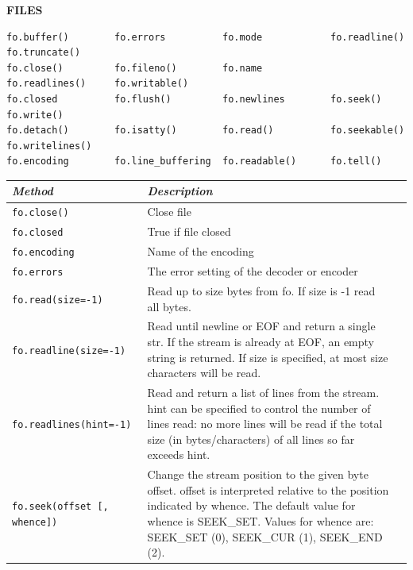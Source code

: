 \documentclass[9pt,a4wide]{extarticle}
\begin{document}
\bigskip
{\LARGE\bf FILES}

\begin{verbatim}
fo.buffer()        fo.errors          fo.mode            fo.readline()      fo.truncate()
fo.close()         fo.fileno()        fo.name            fo.readlines()     fo.writable()
fo.closed          fo.flush()         fo.newlines        fo.seek()          fo.write()
fo.detach()        fo.isatty()        fo.read()          fo.seekable()      fo.writelines()
fo.encoding        fo.line_buffering  fo.readable()      fo.tell()            
\end{verbatim}

\medskip

\begin{supertabular}{|l|p{12cm}|c|}\hline
{\em Method}  & {\em Description}            \\ \hline\hline

{\tt fo.close()}  &  Close file  \\ \hline

{\tt fo.closed}  &  True if file closed  \\ \hline

{\tt fo.encoding}  & Name of the encoding   \\ \hline

{\tt fo.errors}  & The error setting of the decoder or encoder   \\ \hline

{\tt fo.read(size=-1)} & Read up to size bytes from fo. If size is -1 read  
 all bytes. \\ \hline

{\tt fo.readline(size=-1)} & Read until newline or EOF and return a single str. If the stream is already at EOF, an empty string is returned. If size is specified, at most size characters will be read.  \\ \hline

{\tt fo.readlines(hint=-1)} & Read and return a list of lines from the stream. hint can be specified to control the number of lines read: no more lines will be read if the total size (in bytes/characters) of all lines so far exceeds hint.  \\ \hline

{\tt fo.seek(offset [, whence]) } & Change the stream position to the given
byte offset. offset is interpreted relative to the position indicated by
whence. The default value for whence is SEEK\_SET. Values for whence are:
SEEK\_SET (0), SEEK\_CUR (1), SEEK\_END (2).\\ \hline


\end{supertabular}
\end{document}
